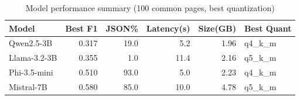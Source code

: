 \begin{table}[htbp]
\centering
\caption{Model performance summary (100 common pages, best quantization)}
\label{tab:model_summary}
\begin{tabular}{lrrrrl}
\toprule
Model & Best F1 & JSON\% & Latency(s) & Size(GB) & Best Quant \\
\midrule
Qwen2.5-3B & 0.317 & 19.0 & 5.2 & 1.96 & q4_k_m \\
Llama-3.2-3B & 0.355 & 1.0 & 11.4 & 2.16 & q5_k_m \\
Phi-3.5-mini & 0.510 & 93.0 & 5.0 & 2.23 & q4_k_m \\
Mistral-7B & 0.580 & 85.0 & 10.0 & 4.78 & q5_k_m \\
\bottomrule
\end{tabular}
\end{table}